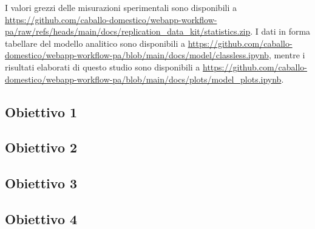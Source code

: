 I valori grezzi delle  misurazioni sperimentali sono disponibili a \url{https://github.com/caballo-domestico/webapp-workflow-pa/raw/refs/heads/main/docs/replication_data_kit/statistics.zip}. I dati in forma tabellare del modello analitico sono disponibili a \url{https://github.com/caballo-domestico/webapp-workflow-pa/blob/main/docs/model/classless.ipynb}, mentre i risultati elaborati di questo studio sono disponibili a \url{https://github.com/caballo-domestico/webapp-workflow-pa/blob/main/docs/plots/model_plots.ipynb}.\\

\subsection{Obiettivo 1}


\subsection{Obiettivo 2}


\subsection{Obiettivo 3}


\subsection{Obiettivo 4}
